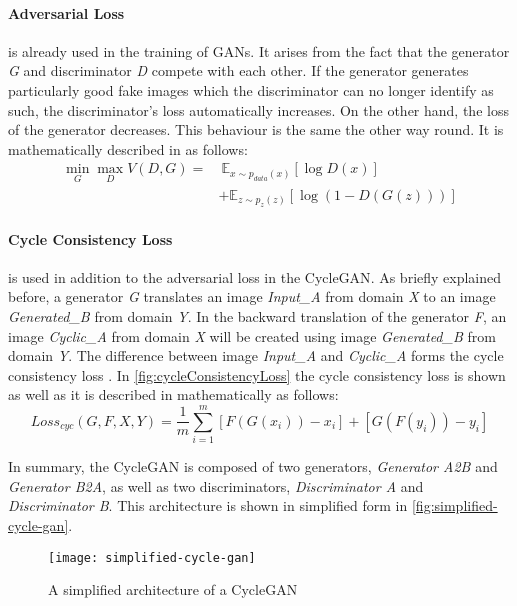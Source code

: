 \documentclass[fleqn,10pt]{SelfArx} %
\begin{document}
\paragraph{Adversarial Loss} is already used in the training of  \ac{GAN}s. It arises from the fact that the generator \textit{G} and discriminator \textit{D} compete with each other. If the generator generates particularly good fake images which the discriminator can no longer identify as such, the discriminator's loss automatically increases. On the other hand, the loss of the generator decreases. This behaviour is the same the other way round. It is mathematically described in \cite{Source-GAN} as follows:
\begin{equation*}
\begin{split}
\min_{G} \max_{D} V(D,G) =&~\mathbb E_{x \sim p_{data}(x)} [\log D(x)] \\\
&+ \mathbb E_{z \sim p_{z}(z)} [\log (1-D(G(z)))]
\end{split}
\end{equation*}

\paragraph{Cycle Consistency Loss} is used in addition to the adversarial loss in the Cycle\ac{GAN}. As briefly explained before, a generator \textit{G} translates an image \textit{Input\_A} from domain \textit{X} to an image \textit{Generated\_B} from domain \textit{Y}. In the backward translation of the generator \textit{F}, an image \textit{Cyclic\_A} from domain \textit{X} will be created using image \textit{Generated\_B} from domain \textit{Y}. The difference between image \textit{Input\_A} and \textit{Cyclic\_A} forms the cycle consistency loss \cite{Introduction-to-Cycle-GANs}. In \autoref{fig:cycleConsistencyLoss} the cycle consistency loss is shown as well as it is described in \cite{Introduction-to-Cycle-GANs} mathematically as follows:
\begin{equation*}
	Loss_{cyc}(G,F,X,Y) = \frac{1}{m} \sum^{m}_{i=1}[F(G(x_i))-x_i]+[G(F(y_i))-y_i]
\end{equation*}

In summary, the Cycle\ac{GAN} is composed of two generators, \textit{Generator A2B} and \textit{Generator B2A}, as well as two discriminators, \textit{Discriminator A} and \textit{Discriminator B}. This architecture is shown in simplified form in \autoref{fig:simplified-cycle-gan}.

\begin{figure}[htb] 
	\centering 
	\texttt{[image: simplified-cycle-gan]}
	\caption{A simplified architecture of a Cycle\ac{GAN} \cite{Introduction-to-Cycle-GANs}}
	\label{fig:simplified-cycle-gan}
\end{figure}
\end{document}
